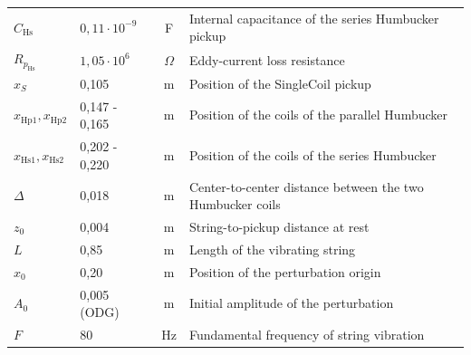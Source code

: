 \documentclass[11pt, a4paper]{article}
\begin{document}
\begin{center}
\begin{tabularx}{\textwidth}{llcX}
$C_{\text{Hs}}$ & $0,11 \cdot 10^{-9}$ & F & Internal capacitance of the series Humbucker pickup \\
$R_{p_{\text{Hs}}}$ & $1,05 \cdot 10^6$ & $\Omega$ & Eddy-current loss resistance \\
\midrule
$x_{S}$ & 0,105 & m & Position of the SingleCoil pickup \\
$x_{\text{Hp1}}, x_{\text{Hp2}}$ & 0,147 - 0,165 & m & Position of the coils of the parallel Humbucker \\
$x_{\text{Hs1}}, x_{\text{Hs2}}$ & 0,202 - 0,220 & m & Position of the coils of the series Humbucker \\
$\Delta$ & 0,018 & m & Center-to-center distance between the two Humbucker coils \\
\midrule
$z_{0}$ & 0,004 & m & String-to-pickup distance at rest \\
$L$ & 0,85 & m & Length of the vibrating string \\
$x_{0}$ & 0,20 & m & Position of the perturbation origin \\
$A_{0}$ & 0,005 (ODG) & m & Initial amplitude of the perturbation \\
$F$ & 80 & Hz & Fundamental frequency of string vibration \\
\bottomrule
\end{tabularx}
\end{center}
\end{document}
